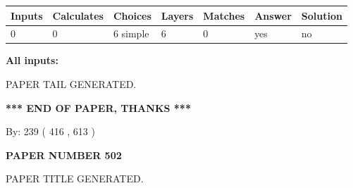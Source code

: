 \documentclass{ctexart}
\begin{document}
 
   
   
   
   
\noindent\begin{tabular}{|l|l|l|l|l|l|l|}
 \hline
Inputs & Calculates & Choices & Layers & Matches & Answer & Solution \\ \hline
 0  & 
 0  & 
 6
  simple  
  & 
 6  & 
 0  & 
  yes & 
  no 
  \\ \hline
 \end{tabular}
   
   
   
   
\noindent{}
   
   
   
   
\noindent\vspace{0.1in}\hspace{-0.08in} {\textbf{\Large{All inputs: }}}
   
   
   
   
   
   
 \vspace{0.2in}
 
   
   
\vspace{2.0in} PAPER TAIL GENERATED.
   
   
   
   
\vspace{1.0in} 
{\textbf{\large{ *** END OF PAPER, THANKS *** }}} 
   
   
\hspace{1.0in} By: 
 239 ( 416 ,  613 )
   
   
   
   
\newpage 
\setcounter{page}{ 
   502001 } 
   
   
   
   
 {\textbf{ \Large{ PAPER NUMBER  502  }}}
   
   
\vspace{0.2in}
   
   
   
   
   
   
   
   
 \vspace{0.2in}
 
 
 
 
   
   
 PAPER TITLE GENERATED.
   
\end{document}
